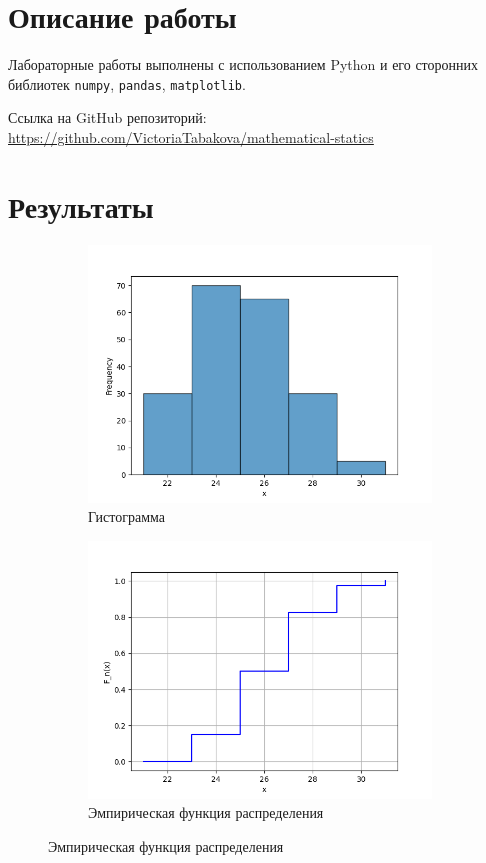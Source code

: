 \documentclass[12pt,a4paper]{article}
\begin{document}
	\section{Описание работы}
	Лабораторные работы выполнены с использованием Python и его сторонних библиотек \verb!numpy!, \verb!pandas!, \verb!matplotlib!.

	Ссылка на GitHub репозиторий: \href{https://github.com/VictoriaTabakova/mathematical-statics}{https://github.com/VictoriaTabakova/mathematical-statics}

	\newpage

	\section{Результаты}

	\begin{figure}[htbp!]
		\begin{subfigure}[htbp!]{0.8\textwidth}
			\begin{center}
				\includegraphics[width = 0.8\linewidth]{../graphics/1_hist.png}
				\caption{Гистограмма}
			\end{center}
		\end{subfigure}

		\begin{subfigure}[htbp!]{0.8\textwidth}
			\begin{center}
				\includegraphics[width = 0.8\linewidth]{../graphics/1_cdf.png}
				\caption{Эмпирическая функция распределения}
			\end{center}
		\end{subfigure}


\end{figure}
\end{document}
